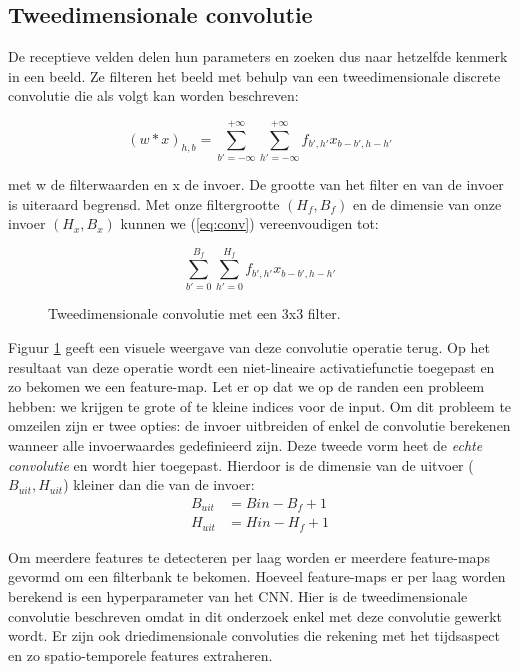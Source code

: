 \subsection{Tweedimensionale convolutie}
De receptieve velden delen hun parameters en zoeken dus naar hetzelfde kenmerk in een beeld. Ze filteren het beeld met behulp van een tweedimensionale discrete convolutie die als volgt kan worden beschreven:

\begin{equation}\label{eq:conv}
(w * x)_{h,b} = \sum_{b'=-\infty}^{+\infty}\sum_{h'=-\infty}^{+\infty} f_{b',h'}x_{b-b',h-h'}
\end{equation}

\npar met w de filterwaarden en x de invoer. De grootte van het filter en van de invoer is uiteraard begrensd. Met onze filtergrootte $(H_f,B_f)$ en de dimensie van onze invoer $(H_x,B_x)$ kunnen we (\ref{eq:conv}) vereenvoudigen tot:

\begin{equation}
\sum_{b'=0}^{B_f}\sum_{h'=0}^{H_f} f_{b',h'}x_{b-b',h-h'}
\end{equation}
\begin{figure}
	\centering
	
	\caption{Tweedimensionale convolutie met een 3x3 filter.}
	\label{fig:conv}
\end{figure}
Figuur \ref{fig:conv} geeft een visuele weergave van deze convolutie operatie terug. Op het resultaat van deze operatie wordt een niet-lineaire activatiefunctie toegepast en zo bekomen we een feature-map. Let er op dat we op de randen een probleem hebben: we krijgen te grote of te kleine indices voor de input. Om dit probleem te omzeilen zijn er twee opties: de invoer uitbreiden of enkel de convolutie berekenen wanneer alle invoerwaardes gedefinieerd zijn. Deze tweede vorm heet de \textit{echte convolutie} en wordt hier toegepast. Hierdoor is de dimensie van de uitvoer ($B_{uit},H_{uit}$) kleiner dan die van de invoer:
\begin{equation}
\begin{aligned}
B_{uit}&=B{in}-B_f+1 \\
H_{uit}&=H{in}-H_f+1
\end{aligned}
\end{equation}

\npar Om meerdere features te detecteren per laag worden er meerdere feature-maps gevormd om een filterbank te bekomen. Hoeveel feature-maps er per laag worden berekend is een hyperparameter van het CNN. Hier is de tweedimensionale convolutie beschreven omdat in dit onderzoek enkel met deze convolutie gewerkt wordt. Er zijn ook driedimensionale convoluties die rekening met het tijdsaspect en zo spatio-temporele features extraheren.
